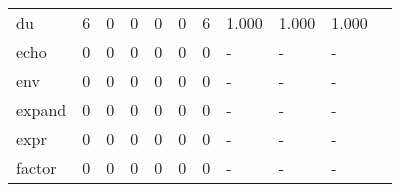 \begin{longtable}{lp{1.2cm}p{1.2cm}p{1.2cm}p{1.2cm}p{1.2cm}p{1.2cm}p{1.2cm}p{1.2cm}p{1.2cm}p{1.2cm}}
du        &                                     6 &                                                  0 &                                                  0 &                                                  0 &                                                  0 &                                                  6 &                                              1.000 &                                              1.000 &                                              1.000 \\
echo      &                                     0 &                                                  0 &                                                  0 &                                                  0 &                                                  0 &                                                  0 &                                                  - &                                                  - &                                                  - \\
env       &                                     0 &                                                  0 &                                                  0 &                                                  0 &                                                  0 &                                                  0 &                                                  - &                                                  - &                                                  - \\
expand    &                                     0 &                                                  0 &                                                  0 &                                                  0 &                                                  0 &                                                  0 &                                                  - &                                                  - &                                                  - \\
expr      &                                     0 &                                                  0 &                                                  0 &                                                  0 &                                                  0 &                                                  0 &                                                  - &                                                  - &                                                  - \\
factor    &                                     0 &                                                  0 &                                                  0 &                                                  0 &                                                  0 &                                                  0 &                                                  - &                                                  - &                                                  - \\

\end{longtable}
